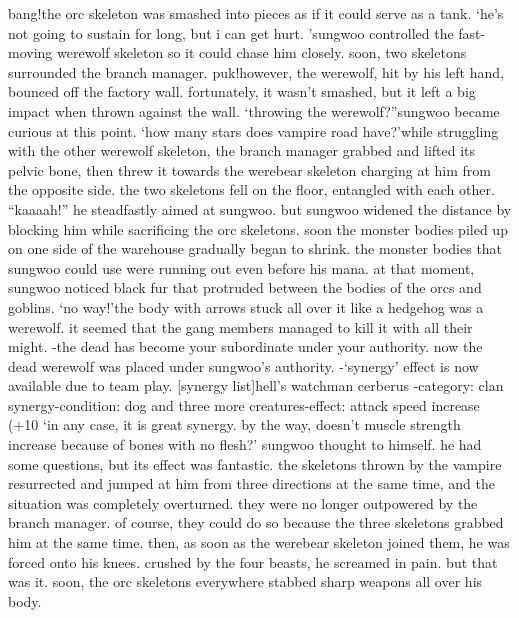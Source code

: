 bang!the orc skeleton was smashed into pieces as if it could serve as a tank.
‘he’s not going to sustain for long, but i can get hurt.
’sungwoo controlled the fast-moving werewolf skeleton so it could chase him closely.
soon, two skeletons surrounded the branch manager.
puk!however, the werewolf, hit by his left hand, bounced off the factory wall.
 fortunately, it wasn’t smashed, but it left a big impact when thrown against the wall.
‘throwing the werewolf?”sungwoo became curious at this point.
‘how many stars does vampire road have?’while struggling with the other werewolf skeleton, the branch manager grabbed and lifted its pelvic bone, then threw it towards the werebear skeleton charging at him from the opposite side.
the two skeletons fell on the floor, entangled with each other.
“kaaaah!”
he steadfastly aimed at sungwoo.
 but sungwoo widened the distance by blocking him while sacrificing the orc skeletons.
 soon the monster bodies piled up on one side of the warehouse gradually began to shrink.
 the monster bodies that sungwoo could use were running out even before his mana.
at that moment, sungwoo noticed black fur that protruded between the bodies of the orcs and goblins.
‘no way!’the body with arrows stuck all over it like a hedgehog was a werewolf.
 it seemed that the gang members managed to kill it with all their might.
-the dead has become your subordinate under your authority.
now the dead werewolf was placed under sungwoo’s authority.
-‘synergy’ effect is now available due to team play.
[synergy list]hell’s watchman cerberus -category: clan synergy-condition: dog and three more creatures-effect: attack speed increase (+10%
‘in any case, it is great synergy.
 by the way, doesn’t muscle strength increase because of bones with no flesh?’ sungwoo thought to himself.
he had some questions, but its effect was fantastic.
 the skeletons thrown by the vampire resurrected and jumped at him from three directions at the same time, and the situation was completely overturned.
they were no longer outpowered by the branch manager.
 of course, they could do so because the three skeletons grabbed him at the same time.
 then, as soon as the werebear skeleton joined them, he was forced onto his knees.
crushed by the four beasts, he screamed in pain.
 but that was it.
soon, the orc skeletons everywhere stabbed sharp weapons all over his body.
